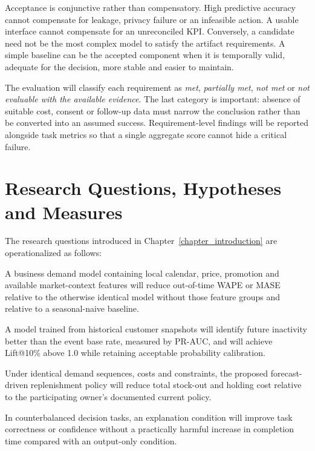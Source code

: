 Acceptance is conjunctive rather than compensatory. High predictive accuracy
cannot compensate for leakage, privacy failure or an infeasible action. A usable
interface cannot compensate for an unreconciled KPI. Conversely, a candidate
need not be the most complex model to satisfy the artifact requirements. A
simple baseline can be the accepted component when it is temporally valid,
adequate for the decision, more stable and easier to maintain.

The evaluation will classify each requirement as \emph{met}, \emph{partially
met}, \emph{not met} or \emph{not evaluable with the available evidence}. The
last category is important: absence of suitable cost, consent or follow-up data
must narrow the conclusion rather than be converted into an assumed success.
Requirement-level findings will be reported alongside task metrics so that a
single aggregate score cannot hide a critical failure.

\section{Research Questions, Hypotheses and Measures}

The research questions introduced in Chapter~\ref{chapter_introduction} are
operationalized as follows:

\begin{description}[style=nextline,leftmargin=2em]
  \item[RQ1 / H1.] A business demand model containing local calendar, price, promotion
  and available market-context features will reduce out-of-time WAPE or MASE
  relative to the otherwise identical model without those feature groups and
  relative to a seasonal-naive baseline.
  \item[RQ2 / H2.] A model trained from historical customer snapshots will
  identify future inactivity better than the event base rate, measured by
  PR-AUC, and will achieve Lift@10\% above 1.0 while retaining acceptable
  probability calibration.
  \item[RQ3 / H3.] Under identical demand sequences, costs and constraints, the
  proposed forecast-driven replenishment policy will reduce total stock-out and
  holding cost relative to the participating owner's documented current policy.
  \item[RQ4 / H4.] In counterbalanced decision tasks, an explanation condition
  will improve task correctness or confidence without a practically harmful
  increase in completion time compared with an output-only condition.
\end{description}

